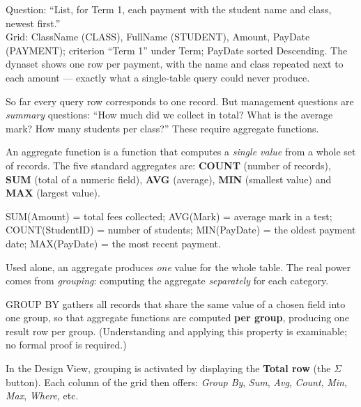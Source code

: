 \documentclass[11pt]{article}
\newcommand{\cle}[1]{{\popxbold\color{popdark}#1}}
\newcounter{popsec}
\newcounter{popsub}
\newcommand{\courssub}[1]{%
  \stepcounter{popsub}%
  \par\vspace{9pt}\noindent{\popxbold\fontsize{11.5}{13}\selectfont\color{popink}{\color{poporange}\thepopsec.\thepopsub}\hspace{6pt}#1}\par\nopagebreak\vspace{4pt}
}
\begin{document}
\begin{exemplebox}
Question: ``List, for Term 1, each payment with the student name and class, newest first.''\\
Grid: ClassName (CLASS), FullName (STUDENT), Amount, PayDate (PAYMENT); criterion ``Term 1'' under Term; PayDate sorted Descending. The dynaset shows one row per payment, with the name and class repeated next to each amount --- exactly what a single-table query could never produce.
\end{exemplebox}

\courssub{Aggregate Functions and Grouping}

So far every query row corresponds to one record. But management questions are \emph{summary} questions: ``How much did we collect in total? What is the average mark? How many students per class?'' These require \cle{aggregate functions}.

\begin{definition}
An \cle{aggregate function} is a function that computes a \emph{single value} from a whole set of records. The five standard aggregates are: \textbf{COUNT} (number of records), \textbf{SUM} (total of a numeric field), \textbf{AVG} (average), \textbf{MIN} (smallest value) and \textbf{MAX} (largest value).
\end{definition}

\begin{exemplebox}
SUM(Amount) = total fees collected; AVG(Mark) = average mark in a test; COUNT(StudentID) = number of students; MIN(PayDate) = the oldest payment date; MAX(PayDate) = the most recent payment.
\end{exemplebox}

Used alone, an aggregate produces \emph{one} value for the whole table. The real power comes from \emph{grouping}: computing the aggregate \emph{separately} for each category.

\begin{propriete}[GROUP BY]
\cle{GROUP BY} gathers all records that share the same value of a chosen field into one group, so that aggregate functions are computed \textbf{per group}, producing one result row per group. (Understanding and applying this property is examinable; no formal proof is required.)
\end{propriete}

In the Design View, grouping is activated by displaying the \textbf{Total row} (the $\Sigma$ button). Each column of the grid then offers: \emph{Group By}, \emph{Sum}, \emph{Avg}, \emph{Count}, \emph{Min}, \emph{Max}, \emph{Where}, etc.
\end{document}
